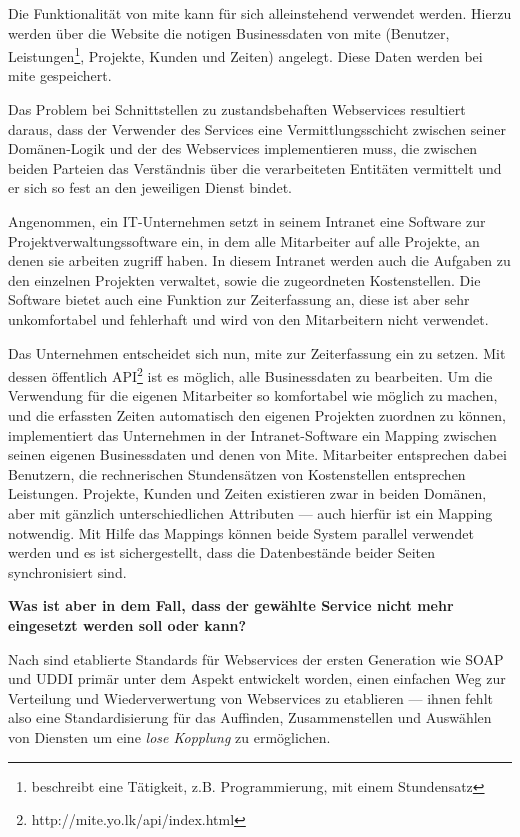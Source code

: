 Die Funktionalität von \ac{mite} kann für sich alleinstehend verwendet werden. Hierzu werden über die Website die notigen Businessdaten von \ac{mite} (Benutzer, Leistungen\footnote{beschreibt eine Tätigkeit, z.B. Programmierung, mit einem Stundensatz}, Projekte, Kunden und Zeiten) angelegt. Diese Daten werden bei \ac{mite} gespeichert. 

Das Problem bei Schnittstellen zu zustandsbehaften Webservices resultiert daraus, dass der Verwender des Services eine Vermittlungsschicht zwischen seiner Domänen-Logik und der des Webservices implementieren muss, die zwischen beiden Parteien das Verständnis über die verarbeiteten Entitäten vermittelt und er sich so fest an den jeweiligen Dienst bindet.

Angenommen, ein IT-Unternehmen setzt in seinem Intranet eine Software zur Projektverwaltungssoftware ein, in dem alle Mitarbeiter auf alle Projekte, an denen sie arbeiten zugriff haben. In diesem Intranet werden auch die Aufgaben zu den einzelnen Projekten verwaltet, sowie die zugeordneten Kostenstellen. Die Software bietet auch eine Funktion zur Zeiterfassung an, diese ist aber sehr unkomfortabel und fehlerhaft und wird von den Mitarbeitern nicht verwendet. 

Das Unternehmen entscheidet sich nun, \ac{mite} zur Zeiterfassung ein zu setzen. Mit dessen öffentlich API\footnote{http://mite.yo.lk/api/index.html} ist es möglich, alle Businessdaten zu bearbeiten. Um die Verwendung für die eigenen Mitarbeiter so komfortabel wie möglich zu machen, und die erfassten Zeiten automatisch den eigenen Projekten zuordnen zu können, implementiert das Unternehmen in der Intranet-Software ein Mapping zwischen seinen eigenen Businessdaten und denen von Mite. Mitarbeiter entsprechen dabei Benutzern, die rechnerischen Stundensätzen von Kostenstellen entsprechen Leistungen. Projekte, Kunden und Zeiten existieren zwar in beiden Domänen, aber mit gänzlich unterschiedlichen Attributen --- auch hierfür ist ein Mapping notwendig. Mit Hilfe das Mappings können beide System parallel verwendet werden und es ist sichergestellt, dass die Datenbestände beider Seiten synchronisiert sind.

\textbf{Was ist aber in dem Fall, dass der gewählte Service nicht mehr eingesetzt werden soll oder kann?}

Nach \cite[Seite 653]{ei-sawsdl} sind etablierte Standards für Webservices der ersten Generation wie \ac{SOAP} und \ac{UDDI} primär unter dem Aspekt entwickelt worden, einen einfachen Weg zur Verteilung und Wiederverwertung von Webservices zu etablieren --- ihnen fehlt also eine Standardisierung für das Auffinden, Zusammenstellen und Auswählen von Diensten um eine \emph{lose Kopplung} zu ermöglichen. 

